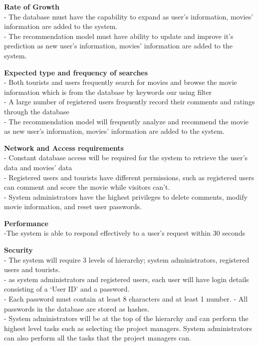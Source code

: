 \documentclass[10pt]{article}
\begin{document}
\noindent 
\textbf{Rate of Growth \\}
- The database must have the capability to expand as user’s information, movies’ information are added to the system.\\
- The recommendation model must have ability to update and improve it's prediction as new user’s information, movies’ information are added to the system.

\noindent 
\textbf{Expected type and frequency of searches\\}
- Both tourists and users frequently search for movies and browse the movie information which is from the database by keywords our using filter\\
- A large number of registered users frequently record their comments and ratings through the database\\
- The recommendation model will frequently analyze and recommend the movie as new user’s information, movies’ information are added to the system.

\noindent \textbf{Network and Access requirements\\}
- Constant database access will be required for the system to retrieve the user’s data and movies’ data\\
- Registered users and tourists have different permissions, such as registered users can comment and score the movie while visitors can't. \\
- System administrators have the highest privileges to delete comments, modify movie information, and reset user passwords.

\noindent \textbf{Performance\\} 
-The system is able to respond effectively to a user's request within 30 seconds

\noindent \textbf{Security\\} 
- The system will require 3 levels of hierarchy; system administrators, registered users and tourists.\\
- as system administrators and registered users, each user will have login details consisting of a ‘User ID’ and a password. \\
- Each password must contain at least 8 characters and at least 1 number. 
- All passwords in the database are stored as hashes. \\
- System administrators will be at the top of the hierarchy and can perform the highest level tasks such as selecting the project managers. System 	administrators can also perform all the tasks that the project managers can.
\end{document}
